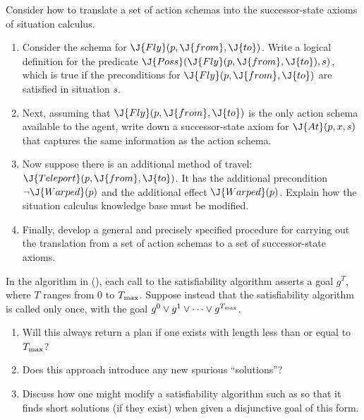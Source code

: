 \begin{exercise}%
Consider how to translate a set of action
schemas into the successor-state axioms of situation calculus.
\begin{enumerate}
\item Consider the schema for \(\J{Fly}(p,\J{from},\J{to})\). Write a logical definition
for the predicate \(\J{Poss}(\J{Fly}(p,\J{from},\J{to}),s)\), which is true if
the preconditions for \(\J{Fly}(p,\J{from},\J{to})\) are satisfied in situation \(s\).
\item Next, assuming that  \(\J{Fly}(p,\J{from},\J{to})\) is the only action schema
available to the agent, write down a successor-state axiom 
for \(\J{At}(p,x,s)\) that captures the same information as the action schema.
\item Now suppose there is an additional method of travel:
\(\J{Teleport}(p,\J{from},\J{to})\).
It has the additional precondition \(\lnot \J{Warped}(p)\) and the additional effect \(\J{Warped}(p)\).
Explain how the situation calculus knowledge base must be modified.
\item Finally, develop 
a general and precisely specified procedure for carrying out the
translation from a set of action  schemas to a set of
successor-state axioms.
\end{enumerate}
\end{exercise} 

\begin{exercise}
In the  algorithm in 
(), each call to the satisfiability
algorithm asserts a goal \(g^T\), where \(T\) ranges from 0 to
\(T_{{\rm max}}\). Suppose instead that the satisfiability algorithm
is called only once, with the goal
\(g^0 \lor g^1 \lor \cdots \lor g^{T_{{\rm max}}}\). 
\begin{enumerate}
\item Will this always return a plan if one exists with length less than or equal to \(T_{{\rm max}}\)?
\item Does this approach introduce any new spurious ``solutions''?
\item Discuss how one might modify a satisfiability algorithm such as  so that
it  finds short solutions (if they exist) when
given a disjunctive goal of this form.
\end{enumerate}
\end{exercise} 





